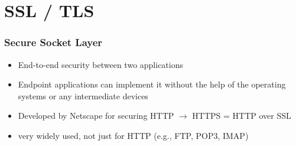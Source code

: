 \documentclass[final]{article}
\begin{document}
\section{SSL / TLS}
\subsubsection*{Secure Socket Layer}
\begin{itemize}[nosep]
    \item End-to-end security between two applications
    \item Endpoint applications can implement it without the help of the operating systems or any intermediate devices
    \item Developed by Netscape for securing HTTP $\rightarrow$ HTTPS = HTTP over SSL
    \item very widely used, not just for HTTP (e.g., FTP, POP3, IMAP)
\end{itemize}
\end{document}
